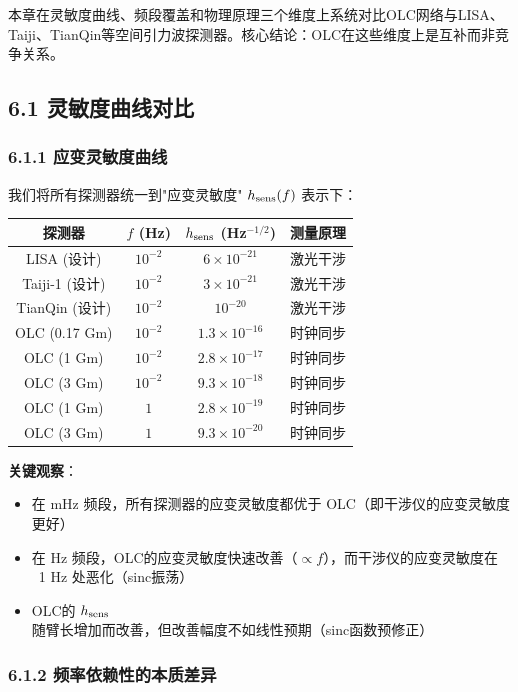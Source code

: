 \documentclass[12pt,a4paper]{article}
\begin{document}
本章在灵敏度曲线、频段覆盖和物理原理三个维度上系统对比OLC网络与LISA、Taiji、TianQin等空间引力波探测器。核心结论：OLC在这些维度上是互补而非竞争关系。

\subsection{6.1 灵敏度曲线对比}


\subsubsection{6.1.1 应变灵敏度曲线}


我们将所有探测器统一到"应变灵敏度" $h_{\rm sens}(f)$ 表示下：

\begin{tabular}{|c|c|c|c|}
\hline
探测器 & $f$ (Hz) & $h_{\rm sens}$ (Hz$^{-1/2}$) & 测量原理 \\
\hline
LISA (设计) & $10^{-2}$ & $6 \times 10^{-21}$ & 激光干涉 \\
Taiji-1 (设计) & $10^{-2}$ & $3 \times 10^{-21}$ & 激光干涉 \\
TianQin (设计) & $10^{-2}$ & $10^{-20}$ & 激光干涉 \\
OLC (0.17 Gm) & $10^{-2}$ & $1.3 \times 10^{-16}$ & 时钟同步 \\
OLC (1 Gm) & $10^{-2}$ & $2.8 \times 10^{-17}$ & 时钟同步 \\
OLC (3 Gm) & $10^{-2}$ & $9.3 \times 10^{-18}$ & 时钟同步 \\
OLC (1 Gm) & $1$ & $2.8 \times 10^{-19}$ & 时钟同步 \\
OLC (3 Gm) & $1$ & $9.3 \times 10^{-20}$ & 时钟同步 \\
\hline
\end{tabular}


\textbf{关键观察}：
\begin{itemize}
  \item[1] 在 mHz 频段，所有探测器的应变灵敏度都优于 OLC（即干涉仪的应变灵敏度更好）
  \item[2] 在 Hz 频段，OLC的应变灵敏度快速改善（$\propto f$），而干涉仪的应变灵敏度在 ~1 Hz 处恶化（sinc振荡）
  \item[3] OLC的 $h_{\rm sens}$ 随臂长增加而改善，但改善幅度不如线性预期（sinc函数预修正）

\end{itemize}
\subsubsection{6.1.2 频率依赖性的本质差异}
\end{document}
